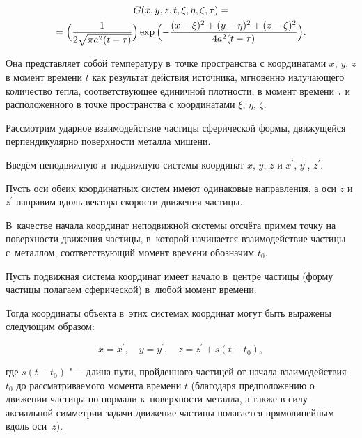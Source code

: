 \begin{multline}

\label{eq:math:ex6}

 G(x,y,z,t,\xi,\eta,\zeta,\tau)=\\

 =\Bigl(\frac{1}{2\sqrt{\pi a^{2}(t-\tau)}}\Bigr)\exp {\Bigl(-\frac{(x-\xi)^{2}+(y-\eta)^{2}+(z-\zeta)^{2}}{4a^{2}(t-\tau)}\Bigr)}.

\end{multline}

Она представляет собой температуру в~точке пространства с координатами $x$, $y$, $z $  в момент времени $t $  как результат действия источника, мгновенно излучающего количество тепла, соответствующее единичной плотности, в момент времени $\tau $  и расположенного в точке пространства с координатами $\xi$, $\eta$, $\zeta $.



Рассмотрим ударное взаимодействие частицы сферической формы, движущейся перпендикулярно поверхности металла мишени. 

Введём неподвижную и~подвижную системы координат   $x$, $y$, $z $ и $x^{\prime}$, $y^{\prime}$, $z^{\prime} $. 

Пусть оси обеих координатных систем имеют одинаковые направления, а оси $z $  и $z^{\prime} $ направим вдоль вектора скорости движения частицы. 

В~качестве начала координат неподвижной системы отсчёта примем точку  на поверхности движения частицы, в~которой начинается взаимодействие частицы с~металлом, соответствующий момент времени обозначим $t_{0} $. 

Пусть подвижная система координат имеет начало в~центре частицы (форму частицы полагаем сферической) в~любой момент времени. 

Тогда координаты объекта в~этих системах координат могут быть выражены следующим образом:

 \begin{equation}\label{eq:math:ex7}

    x=x^{\prime}, \quad y=y^{\prime}, \quad z=z^{\prime}+s(t-t_{0}),

\end{equation}

где $s(t-t_{0}) $ "--- длина пути, пройденного частицей от начала взаимодействия $t_0$ до рассматриваемого момента времени $t$ (благодаря предположению о движении частицы по нормали к~поверхности металла, а также в силу аксиальной симметрии задачи движение частицы полагается прямолинейным вдоль оси~$z $). 

